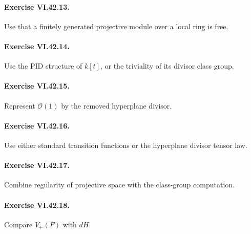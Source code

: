 \paragraph{Exercise VI.42.13.}
\begin{hint}
Use that a finitely generated projective module over a local ring is free.
\end{hint}

\paragraph{Exercise VI.42.14.}
\begin{hint}
Use the PID structure of \(k[t]\), or the triviality of its divisor class group.
\end{hint}

\paragraph{Exercise VI.42.15.}
\begin{hint}
Represent \(\mathcal O(1)\) by the removed hyperplane divisor.
\end{hint}

\paragraph{Exercise VI.42.16.}
\begin{hint}
Use either standard transition functions or the hyperplane divisor tensor law.
\end{hint}

\paragraph{Exercise VI.42.17.}
\begin{hint}
Combine regularity of projective space with the class-group computation.
\end{hint}

\paragraph{Exercise VI.42.18.}
\begin{hint}
Compare \(V_+(F)\) with \(dH\).
\end{hint}

